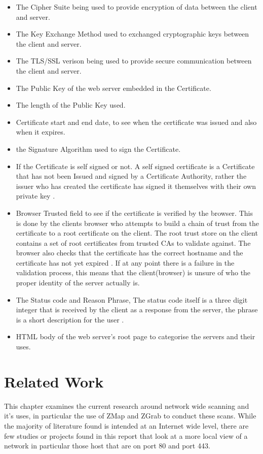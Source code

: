 \documentclass[a4wide,leqno,12pt]{report}
\begin{document}
\begin{itemize}
  \item The Cipher Suite being used to provide encryption of data between the client and server.
  \item The Key Exchange Method used to exchanged cryptographic keys between the client and server.
  \item The TLS/SSL verison being used to provide secure communication between the client and server.
  \item The Public Key of the web server embedded in the Certificate.
  \item The length of the Public Key used.
  \item Certificate start and end date, to see when the certificate was issued and also when it expires.
  \item the Signature Algorithm used to sign the Certificate.
  \item If the Certificate is self signed or not.
  A self signed certificate is a Certificate that has not been Issued and signed by a Certificate Authority, rather the issuer who has created the certificate has signed it themselves with their own private key \cite{housley1998internet}.
  \item Browser Trusted field to see if the certificate is verified by the browser. This is done by the clients browser who attempts to build a chain of trust from the certificate to a root certificate on the client. The root trust store on the client contains a set of root certificates from trusted CAs to validate against. The browser also checks that the certificate has the correct hostname and the certificate has not yet expired \cite{acer2017wild}. If at any point there is a failure in the validation process, this means that the client(browser) is unsure of who the proper identity of the server actually is. 
  \item The Status code and Reason Phrase, The status code itself is a three digit integer that is received by the client as a response from the server, the phrase is a short description for the user \cite{fielding1999hypertext} \cite{berners1996hypertext}.
  \item HTML body of the web server's root page to categorise the servers and their uses.
\end{itemize}

\chapter{Related Work}
This chapter examines the current research around network wide scanning and it's uses, in particular the use of ZMap and ZGrab to conduct these scans. While the majority of literature found is intended at an Internet wide level, there are few studies or projects \cite{researchScans} found in this report that look at a more local view of a network in particular those host that are on port 80 and port 443.
\end{document}
